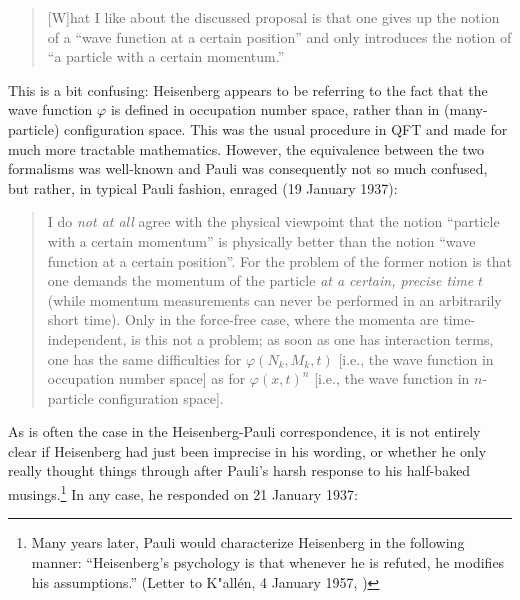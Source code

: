 \documentclass[12pt,a4paper]{article}
\begin{document}
\begin{quote}
[W]hat I like about the discussed proposal is that one gives up the notion of a ``wave function at a certain position'' and only introduces the notion of ``a particle with a certain momentum.''
\end{quote}

This is a bit confusing: Heisenberg appears to be referring to the fact that the wave function $\varphi$ is defined in occupation number space, rather than in (many-particle) configuration space. This was the usual procedure in QFT and made for much more tractable mathematics. However, the equivalence between the two formalisms was well-known and Pauli was consequently not so much confused, but rather, in typical Pauli fashion, enraged (19 January 1937):

\begin{quote}
I do \emph{not at all} agree with the physical viewpoint that the notion ``particle with a certain momentum'' is physically better than the notion ``wave function at a certain position''. For the problem of the former notion is that one demands the momentum of the particle \emph{at a certain, precise time} $t$ (while momentum measurements can never be performed in an arbitrarily short time). Only in the force-free case, where the momenta are time-independent, is this not a problem; as soon as one has interaction terms, one has the same difficulties for $\varphi (N_k, M_k, t)$ [i.e., the wave function in occupation number space] as for $\varphi(x,t)^n$ [i.e., the wave function in $n$-particle configuration space].
 \end{quote}
 
As is often the case in the Heisenberg-Pauli correspondence, it is not entirely clear if Heisenberg had just been imprecise in his wording, or whether he only really thought things through after Pauli's harsh response to his half-baked musings.\footnote{Many years later, Pauli would characterize Heisenberg in the following manner: ``Heisenberg's psychology is that whenever he is refuted, he modifies his assumptions.'' (Letter to K"all\'en, 4 January 1957, \citep{meyenn_2005_wissenschaftlicher})} In any case, he responded on 21 January 1937:
\end{document}

